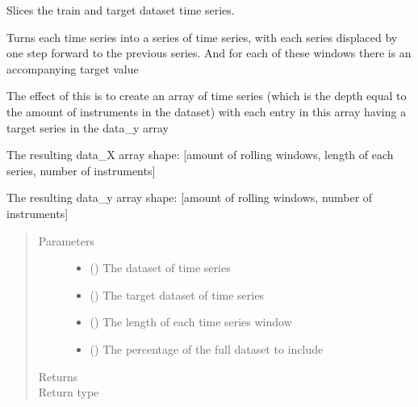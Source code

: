 \documentclass[letterpaper,10pt,english]{sphinxmanual}
\begin{document}

\begin{fulllineitems}
\label{\detokenize{preprocessing:Foresight.preprocessing.slice_series}}
Slices the train and target dataset time series.

Turns each time series into a series of time series, with each series
displaced by one step forward to the previous series. And for each
of these windows there is an accompanying target value

The effect of this is to create an array of time series (which is the depth
equal to the amount of instruments in the dataset) with each entry in this
array having a target series in the data\_y array

The resulting data\_X array shape:
{[}amount of rolling windows, length of each series, number of instruments{]}

The resulting data\_y array shape:
{[}amount of rolling windows, number of instruments{]}
\begin{quote}\begin{description}
\item[{Parameters}] \leavevmode\begin{itemize}
\item {} 
 () \textendash{} The dataset of time series

\item {} 
 () \textendash{} The target dataset of time series

\item {} 
 () \textendash{} The length of each time series window

\item {} 
 () \textendash{} The percentage of the full dataset to include

\end{itemize}

\item[{Returns}] \leavevmode


\item[{Return type}] \leavevmode


\end{description}\end{quote}

\end{fulllineitems}
\end{document}
